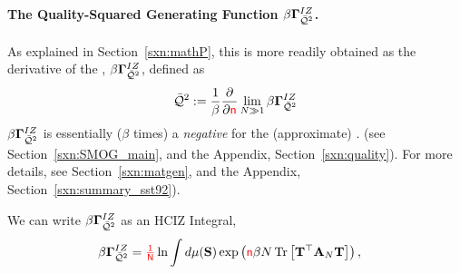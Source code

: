 \paragraph{The Quality-Squared Generating Function $\beta\mathbf{\Gamma}^{IZ}_{\bar{\mathcal{Q}}^{2}}$.}
As explained in Section~\ref{sxn:mathP}, this \QualitySquared is more readily obtained as 
the derivative of the \LayerQualitySquared \GeneratingFunction, $\beta\mathbf{\Gamma}^{IZ}_{\bar{\mathcal{Q}}^{2}}$, defined as
\begin{align}
  \label{eqn:IZG_QT}
  \bar{\mathcal{Q}}^{2} := \dfrac{1}{\beta}\dfrac{\partial }{\partial {\color{red}\sf{n}}} \lim_{N\gg 1}\beta\mathbf{\Gamma}^{IZ}_{\bar{\mathcal{Q}}^{2}}
\end{align}
$\beta\mathbf{\Gamma}^{IZ}_{\bar{\mathcal{Q}}^{2}}$ is essentially ($\beta$ times) a \emph{negative \FreeEnergy} for the (approximate) \LayerQualitySquared.
(see Section~\ref{sxn:SMOG_main}, and the Appendix, Section~\ref{sxn:quality}).
For more details, see Section~\ref{sxn:matgen}, and the Appendix, Section~\ref{sxn:summary_sst92}).

We can write $\beta\mathbf{\Gamma}^{IZ}_{\bar{\mathcal{Q}}^{2}}$ as an HCIZ Integral, 
\begin{align}
  \label{eqn:QT_dS}
  \beta\mathbf{\Gamma}^{IZ}_{\bar{\mathcal{Q}}^{2}}  &= {\color{red}\sf{\tfrac{1}{N}}} \ln\int d\mu(\mathbf{S})\exp\left({\color{red}\sf{n}} \beta N\mbox{}\operatorname{Tr}\left[\mathbf{T}^{\top}\mathbf{A}_N\mathbf{T}\right]\right),
\end{align}

